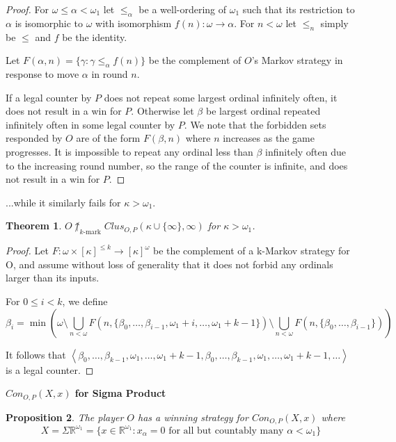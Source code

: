 \documentclass[11pt]{article}
\theoremstyle{plain}
\newtheorem{theorem}{Theorem}
\newtheorem{proposition}[theorem]{Proposition}
\theoremstyle{definition}
\theoremstyle{remark}
\newcommand{\kmarkwin}[1]{\uparrow_{#1\text{-mark}}}
\begin{document}
\begin{proof}
For $\omega\leq\alpha<\omega_1$ let $\leq_{\alpha}$ be a well-ordering of $\omega_1$ such that its restriction to $\alpha$ is isomorphic to $\omega$ with isomorphism $f(n):\omega\to\alpha$. For $n<\omega$ let $\leq_n$ simply be $\leq$ and $f$ be the identity.

Let $F(\alpha,n)=\{\gamma : \gamma \leq_\alpha f(n)\}$ be the complement of $O$'s Markov strategy in response to move $\alpha$ in round $n$.

If a legal counter by $P$ does not repeat some largest ordinal infinitely often, it does not result in a win for $P$. Otherwise let $\beta$ be largest ordinal repeated infinitely often in some legal counter by $P$. We note that the forbidden sets responded by $O$ are of the form $F(\beta,n)$ where $n$ increases as the game progresses. It is impossible to repeat any ordinal less than $\beta$ infinitely often due to the increasing round number, so the range of the counter is infinite, and does not result in a win for $P$.
\end{proof}

...while it similarly fails for $\kappa>\omega_1$.

\begin{theorem}
$O\not\kmarkwin{k}Clus_{O,P}(\kappa\cup\{\infty\},\infty)$ for $\kappa>\omega_1$.
\end{theorem}

\begin{proof}
Let $F:\omega\times[\kappa]^{\leq k} \to [\kappa]^\omega$ be the complement of a k-Markov strategy for O, and assume without loss of generality that it does not forbid any ordinals larger than its inputs.

For $0\leq i < k$, we define \[\beta_i = \min(\omega\setminus \bigcup_{n<\omega} F(n,\{\beta_0,\dots,\beta_{i-1},\omega_1+i,\dots,\omega_1+k-1\})\setminus\bigcup_{n<\omega} F(n,\{\beta_0,\dots,\beta_{i-1}\}))\]

It follows that $\left<\beta_0,\dots,\beta_{k-1},\omega_1,\dots,\omega_1+k-1,\beta_0,\dots,\beta_{k-1},\omega_1,\dots,\omega_1+k-1,\dots\right>$ is a legal counter.
\end{proof}

\centerline{\bf $Con_{O,P}(X,x)$ for Sigma Product}

\begin{proposition}
The player $O$ has a winning strategy for $Con_{O,P}(X,x)$ where \[X=\Sigma\mathbb{R}^{\omega_1}=\{x\in \mathbb{R}^{\omega_1}: x_\alpha = 0 \text{ for all but countably many } \alpha<\omega_1\}\]
\end{proposition}
\end{document}
